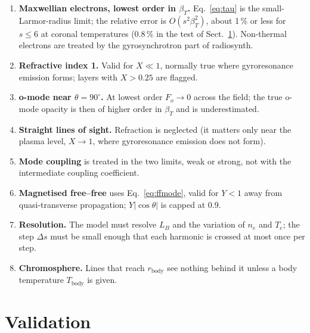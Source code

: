 \documentclass[11pt,a4paper]{article}
\begin{document}
\begin{enumerate}
  \item \textbf{Maxwellian electrons, lowest order in $\beta_T$.} Eq.~\eqref{eq:tau} is the
        small-Larmor-radius limit; the relative error is $O(s^2\beta_T^2)$, about 1\,\% or
        less for $s\le6$ at coronal temperatures (0.8\,\% in the test of Sect.~\ref{sec:validation}). Non-thermal electrons are treated by the
        gyrosynchrotron part of \textsf{radiosynth}.
  \item \textbf{Refractive index 1.} Valid for $X\ll1$, normally true where gyroresonance
        emission forms; layers with $X>0.25$ are flagged.
  \item \textbf{o-mode near $\theta=90^\circ$.} At lowest order $F_o\to0$ across the field;
        the true o-mode opacity is then of higher order in $\beta_T$ and is underestimated.
  \item \textbf{Straight lines of sight.} Refraction is neglected (it matters only near the
        plasma level, $X\to1$, where gyroresonance emission does not form).
  \item \textbf{Mode coupling} is treated in the two limits, weak or strong, not with the
        intermediate coupling coefficient.
  \item \textbf{Magnetised free--free} uses Eq.~\eqref{eq:ffmode}, valid for $Y<1$ away from
        quasi-transverse propagation; $Y|\cos\theta|$ is capped at 0.9.
  \item \textbf{Resolution.} The model must resolve $L_B$ and the variation of $n_e$ and
        $T_e$; the step $\Delta s$ must be small enough that each harmonic is crossed at most
        once per step.
  \item \textbf{Chromosphere.} Lines that reach $r_\text{body}$ see nothing behind it unless
        a body temperature $T_\text{body}$ is given.
\end{enumerate}

\section{Validation}\label{sec:validation}
\end{document}

